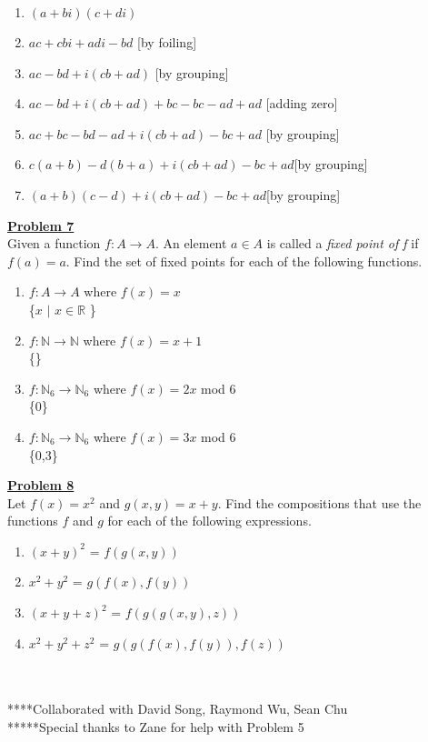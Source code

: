 \documentclass[11pt]{article}
\begin{document}
	\begin{enumerate}
		\item $(a+bi)(c+di)$
		\item $ac + cbi + adi -bd$ [by foiling]
		\item $ac - bd + i(cb+ad)$ [by grouping]
		\item $ac - bd + i(cb+ad) + bc - bc  - ad + ad $ [adding zero]
		\item $ac + bc - bd - ad + i(cb+ad) - bc  + ad$ [by grouping]
		\item $c(a + b) - d(b + a) + i(cb+ad) - bc + ad$[by grouping]
		\item$(a + b)(c - d) + i(cb+ad) - bc + ad$[by grouping]
	\end{enumerate}

\noindent\textbf{\underline{Problem 7}}\\
	Given a function $f: A \rightarrow A$. An element $a \in A$ is called a \textit{fixed point of f} if $f(a) = a$. Find the set of fixed points for each of the following functions.

	\begin{enumerate}
		\item $f: A \rightarrow A$ where $f(x) = x$\\
			\{$x$ $|$ $x \in \mathbb{R}$ \}
			
		\item $f: \mathbb{N} \rightarrow \mathbb{N}$ where $f(x) = x+1$\\
			\{\}

		\item $f: \mathbb{N}_{6} \rightarrow \mathbb{N}_6$ where $f(x) = 2x$ mod 6\\
			\{0\}
		\item $f: \mathbb{N}_{6} \rightarrow \mathbb{N}_6$ where $f(x) = 3x$ mod 6\\
			\{0,3\}

	\end{enumerate}

\noindent\textbf{\underline{Problem 8}}\\
	Let $f(x) = x^2$ and $g(x,y) = x + y$. Find the compositions that use the functions $f$ and $g$ for each of the following expressions.

	\begin{enumerate}
		\item $(x+y)^2$ = $f(g(x,y))$
		\item $x^2 + y^2$ = $g(f(x),f(y))$
		\item $(x+y+z)^2$ = $f(g(g(x,y),z))$
		\item $x^2+y^2+z^2$ = $g(g(f(x), f(y)), f(z))$
	\end{enumerate}
\	\\\\
****Collaborated with David Song, Raymond Wu, Sean Chu\\
*****Special thanks to Zane for help with Problem 5
\end{document}
